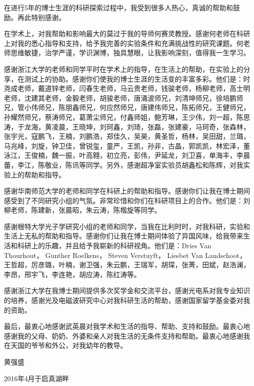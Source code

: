 \begin{thanks}
	
在进行5年的博士生涯的科研探索过程中，我受到很多人热心，真诚的帮助和鼓励。再此特别感谢。

在学术上，对我帮助和影响最大的莫过于我的导师何赛灵教授。感谢何老师在科研上对我的悉心指导和支持，给予我完善的实验条件和充满挑战性的研究课题。何老师思维敏捷，治学严谨，学识渊博，独具慧眼，让我影响深刻，值得我一生学习。

感谢浙江大学的老师和同学平时在学术上的指导，在生活上的帮助，在实验上的分享，在测试上的协助。感谢你们使我的博士生涯的生活变的丰富多彩。他们是：时尧成老师，戴道锌老师，闫春生老师，马云贵老师，钱骏老师，杨柳老师，高士明老师，沈建其老师，金毅老师，胡骏老师，唐涌波师兄，刘清坤师兄，徐培鹏师兄，管小伟师兄，陈朋鑫师兄，何应然师兄，唐建伟师兄，陈拓师兄，王健师兄，孙耀然师兄，蔡涛师兄，葛萧尘师兄，付鑫师姐，鲍芳琳，王少伟，刘一超，陈思涛，于龙海，黄凌晨，王晓坤，刘珂鑫，刘琦，张磊，张建豪，马珂奇，张森林，张宇光，寇鹏飞，王楠，刘鹏浩，郑佳久，吴昊，黄圣哲，杨林，吴田甜，兰璐，马兆峰，刘旋，钟卫佳，曾锐玺，童严，王凯，孙非，古晶，郭凯凯，林宏泽，董泳江，王俊楠，魏一振，叶高翱，初立亮，彭伟，尹延龙，刘卫喜，单海丰，李晨蕾，李江，陈敬业，陈讯等同学。另外，感谢超净室实验员胡鑫松和陈辉，对我实验上的帮助和指导。

感谢华南师范大学的老师和同学在科研上的帮助和指导。感谢你们让我在博士期间感受到了不同研究小组的气氛。非常珍惜和你们在科研项目上的合作。他们是：刘柳老师，陈建新，张晨昭，朱云涛，陈楷旋等同学。

感谢根特大学光子学研究小组的老师和同学，当我在比利时时，对我科研，实验和生活上无私的帮助和指导。感谢你们让我在博士期间体验了异国风味，给我带来生活和科研上的乐趣，并且给予我崭新的科研视角。他们是：Dries Van Thourhout， Gunther Roelkens， Steven Verstuyft， Liesbet Van Landschoot， 王哲超，厉彦璐，叶楠，谢卫强，朱云鹏，王瑞军，胡琛，张菁，田斌，赵浩澜，李昂，邢宇飞，李连艳，胡应涛，陈红涛等。

感谢浙江大学在我博士期间提供多次奖学金和交流平台，感谢光电系对我专业知识的培养，感谢光及电磁波研究中心对我科研生活的帮助，感谢国家留学基金委对我的资助。

最后，最衷心地感谢武英晨对我学术和生活的指导、帮助、支持和鼓励。最衷心地感谢我的父母、奶奶、外婆和亲人对我生活的无条件支持和帮助。最衷心地感谢我在天国的爷爷和外公，对我幼年的教导。

\begin{flushright}
	黄强盛
	
	2016年4月于启真湖畔
\end{flushright}

\end{thanks}
